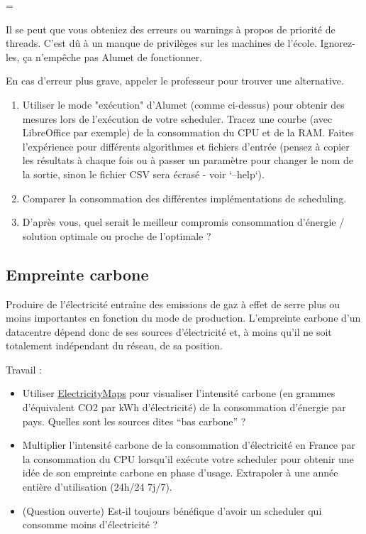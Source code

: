 \documentclass[a4paper,10pt]{article}
\newenvironment{information}
  {\par\begin{mdframed}[linewidth=2pt,linecolor=blue]%
    \begin{list}{}{\leftmargin=1cm
                   \labelwidth=\leftmargin}\item[\emoji{information}]}
  {\end{list}\end{mdframed}\par}
\begin{document}
\begin{information}
    Il se peut que vous obteniez des erreurs ou warnings à propos de priorité de
  threads. C'est dû à un manque de privilèges sur les machines de l'école.
  Ignorez-les, ça n'empêche pas Alumet de fonctionner.
  
  En cas d'erreur plus grave, appeler le professeur pour trouver une alternative.
\end{information}
  
\begin{enumerate}
    \item Utiliser le mode "exécution" d'Alumet (comme ci-dessus) pour obtenir
    des mesures lors de l'exécution de votre scheduler. Tracez une courbe (avec
    LibreOffice par exemple) de la consommation du CPU et de la RAM. Faites
    l'expérience pour différents algorithmes et fichiers d'entrée (pensez à
    copier les résultats à chaque fois ou à passer un paramètre pour changer le
    nom de la sortie, sinon le fichier CSV sera écrasé - voir `--help`).
    \item Comparer la consommation des différentes implémentations de
    scheduling.
    \item D'après vous, quel serait le meilleur compromis consommation d'énergie
    / solution optimale ou proche de l'optimale ?
\end{enumerate}


\subsection{Empreinte carbone}

Produire de l'électricité entraîne des emissions de gaz à effet de serre plus ou
moins importantes en fonction du mode de production. L'empreinte carbone d'un
datacentre dépend donc de ses sources d'électricité et, à moins qu'il ne soit
totalement indépendant du réseau, de sa position.

Travail :
\begin{itemize}
    \item Utiliser \href{https://app.electricitymaps.com/map}{ElectricityMaps}
    pour visualiser l'intensité carbone (en grammes d'équivalent CO2 par kWh
    d'électricité) de la consommation d'énergie par pays. Quelles sont les
    sources dites ``bas carbone'' ?
    \item Multiplier l'intensité carbone de la consommation d'électricité en
    France par la consommation du CPU lorsqu'il exécute votre scheduler pour
    obtenir une idée de son empreinte carbone en phase d'usage. Extrapoler à une
    année entière d'utilisation (24h/24 7j/7).
    \item (Question ouverte) Est-il toujours bénéfique d'avoir un scheduler qui
    consomme moins d'électricité ? %

\end{itemize}
\end{document}
